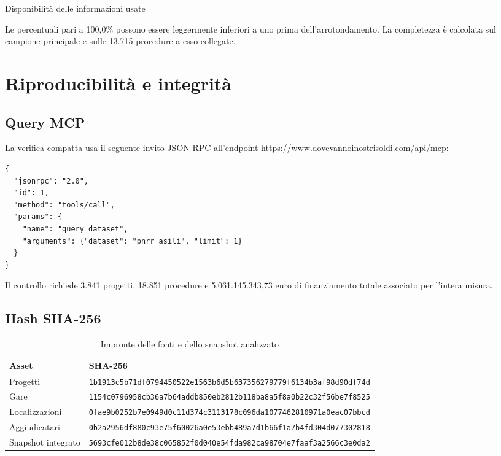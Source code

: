 \documentclass[10pt,a4paper]{article}
\begin{document}
\begin{table}[H]
\centering
\caption{Disponibilità delle informazioni usate}
\resizebox{0.82\textwidth}{!}{}
\end{table}

Le percentuali pari a 100,0\% possono essere leggermente inferiori a uno prima dell'arrotondamento. La completezza è calcolata sul campione principale e sulle 13.715 procedure a esso collegate.

\section{Riproducibilità e integrità}
\label{app:repro}

\subsection{Query MCP}

La verifica compatta usa il seguente invito JSON-RPC all'endpoint \url{https://www.dovevannoinostrisoldi.com/api/mcp}:

\begin{minipage}{\linewidth}
\begin{verbatim}
{
  "jsonrpc": "2.0",
  "id": 1,
  "method": "tools/call",
  "params": {
    "name": "query_dataset",
    "arguments": {"dataset": "pnrr_asili", "limit": 1}
  }
}
\end{verbatim}
\end{minipage}

Il controllo richiede 3.841 progetti, 18.851 procedure e 5.061.145.343,73 euro di finanziamento totale associato per l'intera misura.

\subsection{Hash SHA-256}

\begin{table}[H]
\centering
\scriptsize
\caption{Impronte delle fonti e dello snapshot analizzato}
\begin{tabular}{p{}p{}}
\toprule
Asset & SHA-256 \\
\midrule
Progetti & \texttt{1b1913c5b71df0794450522e1563b6d5b637356279779f6134b3af98d90df74d} \\
Gare & \texttt{1154c0796958cb36a7b64addb850eb2812b118ba8a5f8a0b22c32f56be7f8525} \\
Localizzazioni & \texttt{0fae9b0252b7e0949d0c11d374c3113178c096da1077462810971a0eac07bbcd} \\
Aggiudicatari & \texttt{0b2a2956df880c93e75f60026a0e53ebb489a7d1b66f1a7b4fd304d077302818} \\
Snapshot integrato & \texttt{5693cfe012b8de38c065852f0d040e54fda982ca98704e7faaf3a2566c3e0da2} \\
\bottomrule
\end{tabular}
\end{table}
\end{document}
